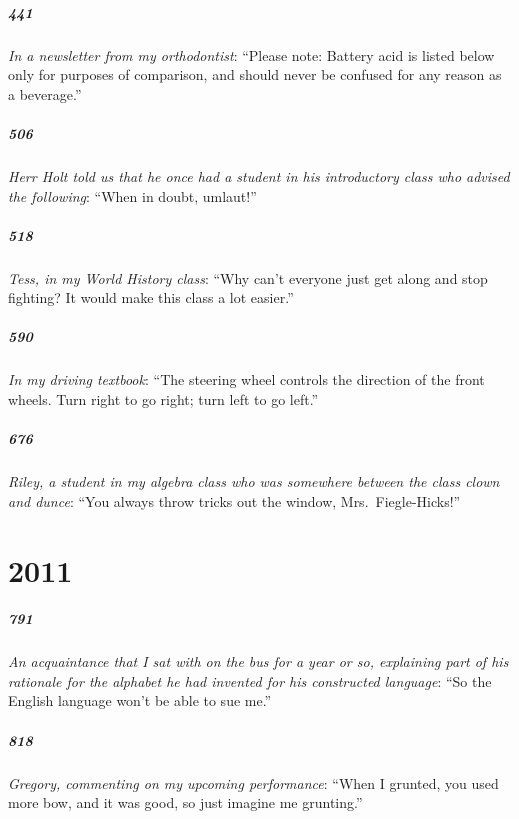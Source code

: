 \documentclass[10pt]{memoir}
\newcommand{\intro}[1]{\emph{#1}}
\begin{document}
\paragraph{441} \intro{In a newsletter from my orthodontist}: ``Please note: Battery acid is listed below only for purposes of comparison, and should never be confused for any reason as a beverage.''

\paragraph{506} \intro{Herr Holt told us that he once had a student in his introductory class who advised the following}: ``When in doubt, umlaut!''

\paragraph{518} \intro{Tess, in my World History class}: ``Why can't everyone just get along and stop fighting? It would make this class a lot easier.''

\paragraph{590} \intro{In my driving textbook}: ``The steering wheel controls the direction of the front wheels. Turn right to go right; turn left to go left.''

\paragraph{676} \intro{Riley, a student in my algebra class who was somewhere between the class clown and dunce}: ``You always throw tricks out the window, Mrs.\ Fiegle-Hicks!''

\chapter{2011}
\paragraph{791} \intro{An acquaintance that I sat with on the bus for a year or so, explaining part of his rationale for the alphabet he had invented for his constructed language}: ``So the English language won't be able to sue me.''

\paragraph{818} \intro{Gregory, commenting on my upcoming performance}: ``When I grunted, you used more bow, and it was good, so just imagine me grunting.''
\end{document}
